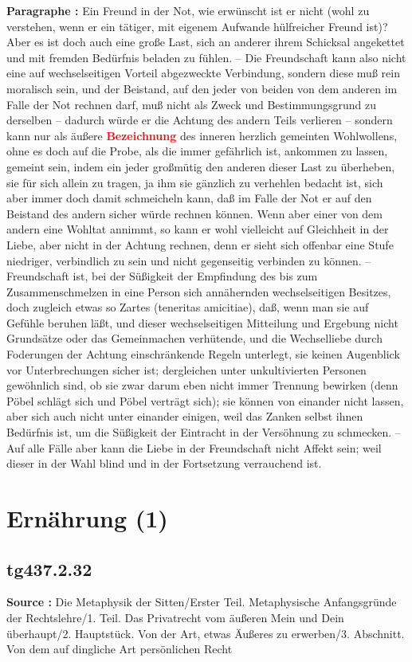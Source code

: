 \documentclass[a4paper,12pt,twoside]{book}
\newcommand{\match}[1]{\textcolor{red}{\textbf{#1}}}
\newcommand{\unnumberedsection}[1]{
	\section*{#1}
	\addcontentsline{toc}{section}{#1}
	\markright{#1}
}
\begin{document}
	\textbf{Paragraphe : }Ein Freund in der Not, wie erwünscht ist er nicht (wohl zu verstehen, wenn er ein tätiger, mit eigenem Aufwande hülfreicher Freund ist)? Aber es ist doch auch eine große Last, sich an anderer ihrem Schicksal angekettet und mit fremden Bedürfnis beladen zu fühlen. – Die Freundschaft kann also nicht eine auf wechselseitigen Vorteil abgezweckte Verbindung, sondern diese muß rein moralisch sein, und der Beistand, auf den jeder von beiden von dem anderen im Falle der Not rechnen darf, muß nicht als Zweck und Bestimmungsgrund zu derselben – dadurch würde er die Achtung des andern Teils verlieren – sondern kann nur als äußere \match{Bezeichnung} des inneren herzlich gemeinten Wohlwollens, ohne es doch auf die Probe, als die immer gefährlich ist, ankommen zu lassen, gemeint sein, indem ein jeder großmütig den anderen dieser Last zu überheben, sie für sich allein zu tragen, ja ihm sie gänzlich zu verhehlen bedacht ist, sich aber immer doch damit schmeicheln kann, daß im Falle der Not er auf den Beistand des andern sicher würde rechnen können. Wenn aber einer von dem andern eine Wohltat annimmt, so kann er wohl vielleicht auf Gleichheit in der Liebe, aber nicht in der Achtung rechnen, denn er sieht sich offenbar eine Stufe niedriger, verbindlich zu sein und nicht gegenseitig verbinden zu können. – Freundschaft ist, bei der Süßigkeit der Empfindung des bis zum Zusammenschmelzen in eine Person sich annähernden wechselseitigen Besitzes, doch zugleich etwas so Zartes (teneritas amicitiae), daß, wenn man sie auf Gefühle beruhen läßt, und dieser wechselseitigen Mitteilung und Ergebung nicht Grundsätze oder das Gemeinmachen verhütende, und die Wechselliebe durch Foderungen der Achtung einschränkende  Regeln unterlegt, sie keinen Augenblick vor Unterbrechungen sicher ist; dergleichen unter unkultivierten Personen gewöhnlich sind, ob sie zwar darum eben nicht immer Trennung bewirken (denn Pöbel schlägt sich und Pöbel verträgt sich); sie können von einander nicht lassen, aber sich auch nicht unter einander einigen, weil das Zanken selbst ihnen Bedürfnis ist, um die Süßigkeit der Eintracht in der Versöhnung zu schmecken. – Auf alle Fälle aber kann die Liebe in der Freundschaft nicht Affekt sein; weil dieser in der Wahl blind und in der Fortsetzung verrauchend ist. 
	
	\unnumberedsection{Ernährung (1)} 
	\subsection*{tg437.2.32} 
	\textbf{Source : }Die Metaphysik der Sitten/Erster Teil. Metaphysische Anfangsgründe der Rechtslehre/1. Teil. Das Privatrecht vom äußeren Mein und Dein überhaupt/2. Hauptstück. Von der Art, etwas Äußeres zu erwerben/3. Abschnitt. Von dem auf dingliche Art persönlichen Recht\\  
	
\end{document}
